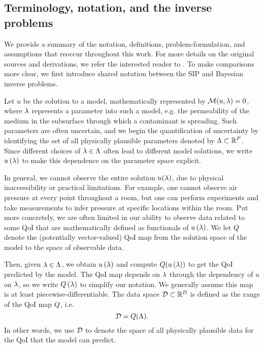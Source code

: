 \subsection{Terminology, notation, and the inverse problems}
We provide a summary of the notation, definitions, problem-formulation, and assumptions that reoccur throughout this work.
For more details on the original sources and derivations,  we refer the interested reader to \cite{BES12, BE13, BET+14, BJW18a, BWY20}.
To make comparisons more clear, we first introduce shared notation between the SIP and Bayesian inverse problems.


Let $u$ be the solution to a model, mathematically represented by $\mathcal{M}(u, \lambda) = 0$, where $\lambda$ represents a parameter into such a model, e.g. the permeability of the medium in the subsurface through which a contaminant is spreading.
Such parameters are often uncertain, and we begin the quantification of uncertainty by identifying the set of all physically plausible parameters denoted by ${\Lambda}\subset\mathbb{R}^P$.
Since different choices of $\lambda \in {\Lambda}$ often lead to different model solutions, we write $u\left ( \lambda \right )$ to make this dependence on the parameter space explicit.

In general, we cannot observe the entire solution $u(\lambda)$, due to physical inaccessibility or practical limitations.
For example, one cannot observe air pressure at every point throughout a room, but one can perform experiments and take measurements to infer pressure at specific locations within the room.
Put more concretely, we are often limited in our ability to observe data related to some QoI that are mathematically defined as functionals of $u\left ( \lambda \right )$.
We let $Q$ denote the (potentially vector-valued) QoI map from the solution space of the model to the space of observable data.

Then, given $\lambda \in {\Lambda}$, we obtain $u\left ( \lambda \right )$ and compute $Q(u\left ( \lambda \right ))$ to get the QoI predicted by the model.
The QoI map depends on $\lambda$ through the dependency of $u$ on $\lambda$, so we write $Q\left ( \lambda \right )$ to simplify our notation.
We generally assume this map is at least piecewise-differentiable.
The data space $\mathcal{D} \subset \mathbb{R}^D$ is defined as the range of the QoI map $Q$, i.e.
\[
\mathcal{D} = Q({\Lambda}).
\]
In other words, we use $\mathcal{D}$ to denote the space of all physically plausible data for the QoI that the model can predict.


